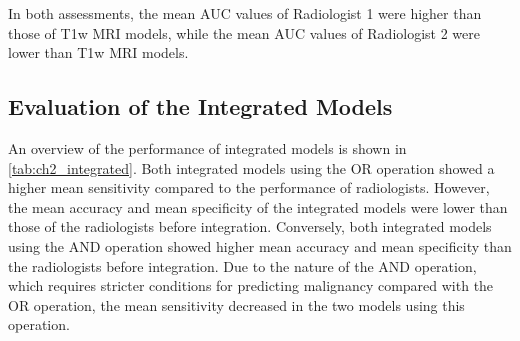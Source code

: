 In both assessments, the mean AUC values of Radiologist 1 were higher than those of T1w MRI models, while the mean AUC values of Radiologist 2 were lower than T1w MRI models.

\subsection{Evaluation of the Integrated Models}
An overview of the performance of integrated models is shown in \autoref{tab:ch2_integrated}.
Both integrated models using the OR operation showed a higher mean sensitivity compared to the performance of radiologists.
However, the mean accuracy and mean specificity of the integrated models were lower than those of the radiologists before integration.
Conversely, both integrated models using the AND operation showed higher mean accuracy and mean specificity than the radiologists before integration.
Due to the nature of the AND operation, which requires stricter conditions for predicting malignancy compared with the OR operation, the mean sensitivity decreased in the two models using this operation.

